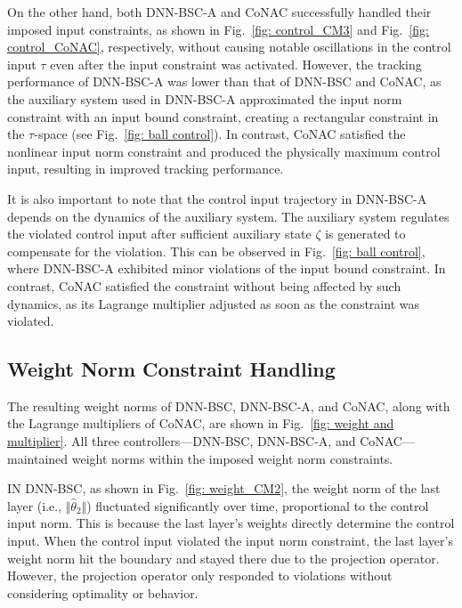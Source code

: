 \documentclass[lettersize,journal]{IEEEtran}
\begin{document}
On the other hand, both DNN-BSC-A and CoNAC successfully handled their imposed input constraints, as shown in Fig.~\ref{fig: control_CM3} and Fig.~\ref{fig: control_CoNAC}, respectively, without causing notable oscillations in the control input $\tau$ even after the input constraint was activated. However, the tracking performance of DNN-BSC-A was lower than that of DNN-BSC and CoNAC, as the auxiliary system used in DNN-BSC-A approximated the input norm constraint with an input bound constraint, creating a rectangular constraint in the $\tau$-space (see Fig.~\ref{fig: ball control}). In contrast, CoNAC satisfied the nonlinear input norm constraint and produced the physically maximum control input, resulting in improved tracking performance. 

It is also important to note that the control input trajectory in DNN-BSC-A depends on the dynamics of the auxiliary system. The auxiliary system regulates the violated control input after sufficient auxiliary state $\zeta$ is generated to compensate for the violation. This can be observed in Fig.~\ref{fig: ball control}, where DNN-BSC-A exhibited minor violations of the input bound constraint. In contrast, CoNAC satisfied the constraint without being affected by such dynamics, as its Lagrange multiplier adjusted as soon as the constraint was violated.


\subsection{Weight Norm Constraint Handling}

The resulting weight norms of DNN-BSC, DNN-BSC-A, and CoNAC, along with the Lagrange multipliers of CoNAC, are shown in Fig.~\ref{fig: weight and multiplier}. All three controllers—DNN-BSC, DNN-BSC-A, and CoNAC—maintained weight norms within the imposed weight norm constraints.

IN DNN-BSC, as shown in Fig.~\ref{fig: weight_CM2}, the weight norm of the last layer (i.e., $\Vert {{{\hat \theta }_2}} \Vert$) fluctuated significantly over time, proportional to the control input norm. This is because the last layer’s weights directly determine the control input. When the control input violated the input norm constraint, the last layer’s weight norm hit the boundary and stayed there due to the projection operator. However, the projection operator only responded to violations without considering optimality or behavior.
\end{document}
